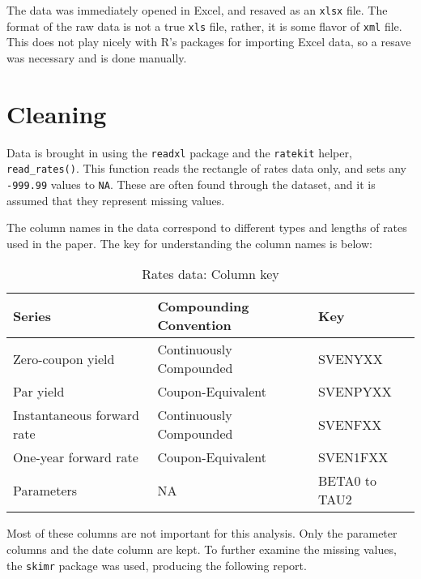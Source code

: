 \documentclass[openany]{book}
\theoremstyle{definition}
\theoremstyle{definition}
\theoremstyle{definition}
\theoremstyle{remark}
\begin{document}
The data was immediately opened in Excel, and resaved as an
\texttt{xlsx} file. The format of the raw data is not a true
\texttt{xls} file, rather, it is some flavor of \texttt{xml} file. This
does not play nicely with R's packages for importing Excel data, so a
resave was necessary and is done manually.

\hypertarget{cleaning}{%
\section{Cleaning}\label{cleaning}}

Data is brought in using the \texttt{readxl} package and the
\texttt{ratekit} helper, \texttt{read\_rates()}. This function reads the
rectangle of rates data only, and sets any \texttt{-999.99} values to
\texttt{NA}. These are often found through the dataset, and it is
assumed that they represent missing values.

\small

\normalsize

The column names in the data correspond to different types and lengths
of rates used in the paper. The key for understanding the column names
is below:

\small

\begin{table}[H]

\caption{\label{tab:meta}Rates data: Column key}
\centering
\begin{tabular}[t]{lll}
\toprule
Series & Compounding Convention & Key\\
\midrule
Zero-coupon yield & Continuously Compounded & SVENYXX\\
Par yield & Coupon-Equivalent & SVENPYXX\\
Instantaneous forward rate & Continuously Compounded & SVENFXX\\
One-year forward rate & Coupon-Equivalent & SVEN1FXX\\
Parameters & NA & BETA0 to TAU2\\
\bottomrule
\end{tabular}
\end{table}

\normalsize

Most of these columns are not important for this analysis. Only the
parameter columns and the date column are kept. To further examine the
missing values, the \texttt{skimr} package was used, producing the
following report.

\small
\end{document}
